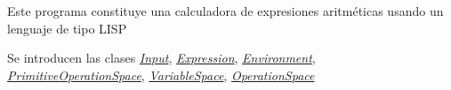 Este programa constituye una calculadora de expresiones aritméticas usando un lenguaje de tipo L\+I\+SP

Se introducen las clases {\itshape \hyperlink{class_input}{Input}}, {\itshape \hyperlink{class_expression}{Expression}}, {\itshape \hyperlink{class_environment}{Environment}}, {\itshape \hyperlink{class_primitive_operation_space}{Primitive\+Operation\+Space}}, {\itshape \hyperlink{class_variable_space}{Variable\+Space}}, {\itshape \hyperlink{class_operation_space}{Operation\+Space}} 